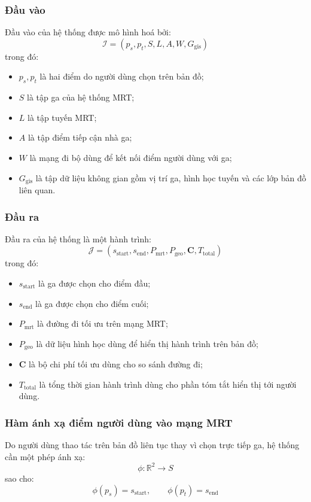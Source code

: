 \documentclass[../DoAn.tex]{subfiles}
\begin{document}
\subsubsection{Đầu vào}
Đầu vào của hệ thống được mô hình hoá bởi:
\[
\mathcal{I} = \left(p_s, p_t, S, L, A, W, G_{\text{gis}}\right)
\]
trong đó:
\begin{itemize}
    \item $p_s, p_t$ là hai điểm do người dùng chọn trên bản đồ;
    \item $S$ là tập ga của hệ thống MRT;
    \item $L$ là tập tuyến MRT;
    \item $A$ là tập điểm tiếp cận nhà ga;
    \item $W$ là mạng đi bộ dùng để kết nối điểm người dùng với ga;
    \item $G_{\text{gis}}$ là tập dữ liệu không gian gồm vị trí ga, hình học tuyến và các lớp bản đồ liên quan.
\end{itemize}

\subsubsection{Đầu ra}
Đầu ra của hệ thống là một hành trình:
\[
\mathcal{J} = \left(s_{\text{start}}, s_{\text{end}}, P_{\text{mrt}}, P_{\text{geo}}, \mathbf{C}, T_{\text{total}}\right)
\]
trong đó:
\begin{itemize}
    \item $s_{\text{start}}$ là ga được chọn cho điểm đầu;
    \item $s_{\text{end}}$ là ga được chọn cho điểm cuối;
    \item $P_{\text{mrt}}$ là đường đi tối ưu trên mạng MRT;
    \item $P_{\text{geo}}$ là dữ liệu hình học dùng để hiển thị hành trình trên bản đồ;
    \item $\mathbf{C}$ là bộ chi phí tối ưu dùng cho so sánh đường đi;
    \item $T_{\text{total}}$ là tổng thời gian hành trình dùng cho phần tóm tắt hiển thị tới người dùng.
\end{itemize}

\subsubsection{Hàm ánh xạ điểm người dùng vào mạng MRT}
Do người dùng thao tác trên bản đồ liên tục thay vì chọn trực tiếp ga, hệ thống cần một phép ánh xạ:
\[
\phi : \mathbb{R}^{2} \rightarrow S
\]
sao cho:
\[
\phi(p_s) = s_{\text{start}}, \qquad \phi(p_t) = s_{\text{end}}
\]
\end{document}
